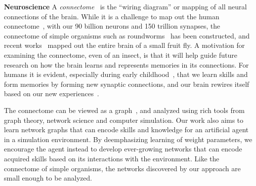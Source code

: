 \textbf{Neuroscience}\: A \textit{connectome}~\cite{seung2012connectome} is the “wiring diagram” or mapping of all neural connections of the brain. While it is a challenge to map out the human connectome~\cite{sporns2005human}, with our 90 billion neurons and 150 trillion synapses, the connectome of simple organisms such as roundworms~\cite{white1986structure,varshney2011structural} has been constructed, and recent works~\cite{eichler2017complete,takemura2017connectome} mapped out the entire brain of a small fruit fly. A motivation for examining the connectome, even of an insect, is that it will help guide future research on how the brain learns and represents memories in its connections. For humans it is evident, especially during early childhood~\cite{huttenlocher1990morphometric,tierney2009brain}, that we learn skills and form memories by forming new synaptic connections, and our brain rewires itself based on our new experiences~\cite{black1990learning,bruer1999neural,kleim2002motor,dayan2011neuroplasticity}.

The connectome can be viewed as a graph~\cite{bullmore2009complex,he2010graph,van2011rich}, and analyzed using rich tools from graph theory, network science and computer simulation. Our work also aims to learn network graphs that can encode skills and knowledge for an artificial agent in a simulation environment. By deemphasizing learning of weight parameters, we encourage the agent instead to develop ever-growing networks that can encode acquired skills based on its interactions with the environment. Like the connectome of simple organisms, the networks discovered by our approach are small enough to be analyzed.
